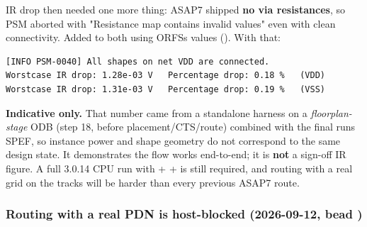 \begin{record}
IR drop then needed one more thing: ASAP7 shipped \textbf{no via
resistances}, so PSM aborted with  "Resistance map
contains invalid values" even with clean connectivity. Added
 to both  using
ORFS\textquotesingle s values ().
With that:

\begin{lstlisting}[language={}]
[INFO PSM-0040] All shapes on net VDD are connected.
Worstcase IR drop: 1.28e-03 V   Percentage drop: 0.18 %   (VDD)
Worstcase IR drop: 1.31e-03 V   Percentage drop: 0.19 %   (VSS)
\end{lstlisting}

\warn{} \textbf{Indicative only.} That number came from a standalone
harness on a \emph{floorplan-stage} ODB (step 18, before
placement/\allowbreak{}CTS/\allowbreak{}route) combined with the final
run\textquotesingle s SPEF, so instance power and shape geometry do not
correspond to the same design state. It demonstrates the flow works
end-to-end; it is \textbf{not} a sign-off IR figure. A full 3.0.14 CPU
run with  +  + 
is still required, and routing with a real grid on the tracks will be
harder than every previous ASAP7 route.

\end{record}

\subsubsection{\texorpdfstring{Routing with a real PDN is host-blocked
(2026-09-12, bead
)}{Routing with a real PDN is host-blocked (2026-09-12, bead )}}\label{cr:run:phase5:routing-with-a-real-pdn-is-host-blocked-2026-09-12-bead-4l8}

